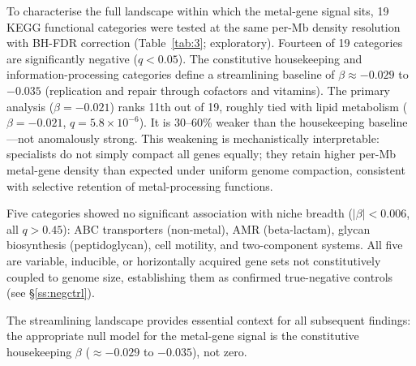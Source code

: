 \documentclass[times]{zHenriquesLab-StyleBioRxiv}
\begin{document}
To characterise the full landscape within which the metal-gene signal sits,
19 KEGG functional categories were tested at the same per-Mb density resolution
with BH-FDR correction (Table~\ref{tab:3}; exploratory). Fourteen of 19
categories are significantly negative ($q < 0.05$). The constitutive
housekeeping and information-processing categories define a streamlining
baseline of $\beta \approx -0.029$ to $-0.035$ (replication and repair through
cofactors and vitamins). The primary analysis ($\beta = -0.021$) ranks 11th out of 19, roughly
tied with lipid metabolism ($\beta = -0.021$, $q = 5.8 \times 10^{-6}$). It is
30--60\% weaker than the housekeeping baseline---not anomalously strong. This
weakening is mechanistically interpretable: specialists do not simply compact
all genes equally; they retain higher per-Mb metal-gene density than expected under uniform genome
compaction, consistent with selective retention of metal-processing functions.

Five categories showed no significant association with niche breadth
($|\beta| < 0.006$, all $q > 0.45$): ABC transporters (non-metal), AMR
(beta-lactam), glycan biosynthesis (peptidoglycan), cell motility, and
two-component systems. All five are variable, inducible, or horizontally
acquired gene sets not constitutively coupled to genome size, establishing them
as confirmed true-negative controls (see \S\ref{ss:negctrl}).

The streamlining landscape provides essential context for all subsequent
findings: the appropriate null model for the metal-gene signal is the
constitutive housekeeping $\beta$ ($\approx -0.029$ to $-0.035$), not zero.
\end{document}

